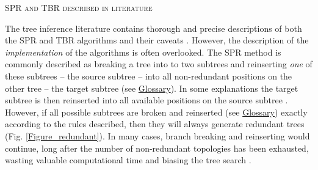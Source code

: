 \documentclass[12pt,letterpaper]{article}
\renewcommand{\section}[1]{%
\bigskip
\begin{center}
\begin{Large}
\normalfont\scshape #1
\medskip
\end{Large}
\end{center}}
\begin{document}


\section{SPR and TBR described in literature}
The tree inference literature contains thorough and precise descriptions of both the SPR and TBR algorithms \citep[e.g.][]{allen2001subtree,felsenstein2004inferring} and their caveats \citep[i.e speed and reliability - e.g.][]{morrison2007increasing,lakner2008efficiency,goloboff2014bias}.
However, the description of the \textit{implementation} of the algorithms is often overlooked.
The SPR method is commonly described as breaking a tree into to two subtrees and reinserting \textit{one} of these subtrees -- the source subtree %
-- into all non-redundant positions on the other tree -- the target subtree (see \hyperref[Glossary]{Glossary}).
In some explanations the target subtree is then reinserted into all available positions on the source subtree \citep[e.g.][Fig. 8.5]{swofford2003phylogeny}.
However, if all possible subtrees are broken and reinserted (see \hyperref[Glossary]{Glossary}) %
 exactly according to the rules described, then they will always generate redundant trees (Fig. \ref{Figure_redundant}). 
In many cases, branch breaking and reinserting would continue, long after the number of non-redundant topologies has been exhausted, wasting valuable computational time and biasing the tree search \citep{goloboff2014bias}.
\end{document}
